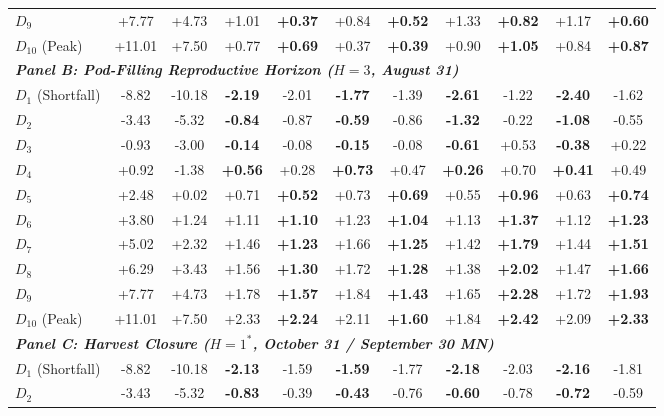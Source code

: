 \begin{table}[htbp]
\begin{tabular*}{\textwidth}{@{\extracolsep{\fill}} l cc cc cc cc cc @{}}
$D_{9}$ & +7.77 & +4.73 & +1.01 & \textbf{+0.37} & +0.84 & \textbf{+0.52} & +1.33 & \textbf{+0.82} & +1.17 & \textbf{+0.60} \\
$D_{10}$ (Peak) & +11.01 & +7.50 & +0.77 & \textbf{+0.69} & +0.37 & \textbf{+0.39} & +0.90 & \textbf{+1.05} & +0.84 & \textbf{+0.87} \\
\midrule
\multicolumn{11}{l}{\textit{\textbf{Panel B: Pod-Filling Reproductive Horizon ($H = 3$, August 31)}}} \\
\midrule
$D_{1}$ (Shortfall) & -8.82 & -10.18 & \textbf{-2.19} & -2.01 & \textbf{-1.77} & -1.39 & \textbf{-2.61} & -1.22 & \textbf{-2.40} & -1.62 \\
$D_{2}$ & -3.43 & -5.32 & \textbf{-0.84} & -0.87 & \textbf{-0.59} & -0.86 & \textbf{-1.32} & -0.22 & \textbf{-1.08} & -0.55 \\
$D_{3}$ & -0.93 & -3.00 & \textbf{-0.14} & -0.08 & \textbf{-0.15} & -0.08 & \textbf{-0.61} & +0.53 & \textbf{-0.38} & +0.22 \\
$D_{4}$ & +0.92 & -1.38 & \textbf{+0.56} & +0.28 & \textbf{+0.73} & +0.47 & \textbf{+0.26} & +0.70 & \textbf{+0.41} & +0.49 \\
$D_{5}$ & +2.48 & +0.02 & +0.71 & \textbf{+0.52} & +0.73 & \textbf{+0.69} & +0.55 & \textbf{+0.96} & +0.63 & \textbf{+0.74} \\
$D_{6}$ & +3.80 & +1.24 & +1.11 & \textbf{+1.10} & +1.23 & \textbf{+1.04} & +1.13 & \textbf{+1.37} & +1.12 & \textbf{+1.23} \\
$D_{7}$ & +5.02 & +2.32 & +1.46 & \textbf{+1.23} & +1.66 & \textbf{+1.25} & +1.42 & \textbf{+1.79} & +1.44 & \textbf{+1.51} \\
$D_{8}$ & +6.29 & +3.43 & +1.56 & \textbf{+1.30} & +1.72 & \textbf{+1.28} & +1.38 & \textbf{+2.02} & +1.47 & \textbf{+1.66} \\
$D_{9}$ & +7.77 & +4.73 & +1.78 & \textbf{+1.57} & +1.84 & \textbf{+1.43} & +1.65 & \textbf{+2.28} & +1.72 & \textbf{+1.93} \\
$D_{10}$ (Peak) & +11.01 & +7.50 & +2.33 & \textbf{+2.24} & +2.11 & \textbf{+1.60} & +1.84 & \textbf{+2.42} & +2.09 & \textbf{+2.33} \\
\midrule
\multicolumn{11}{l}{\textit{\textbf{Panel C: Harvest Closure ($H = 1^*$, October 31 / September 30 MN)}}} \\
\midrule
$D_{1}$ (Shortfall) & -8.82 & -10.18 & \textbf{-2.13} & -1.59 & \textbf{-1.59} & -1.77 & \textbf{-2.18} & -2.03 & \textbf{-2.16} & -1.81 \\
$D_{2}$ & -3.43 & -5.32 & \textbf{-0.83} & -0.39 & \textbf{-0.43} & -0.76 & \textbf{-0.60} & -0.78 & \textbf{-0.72} & -0.59 \\

\end{tabular*}
\end{table}
